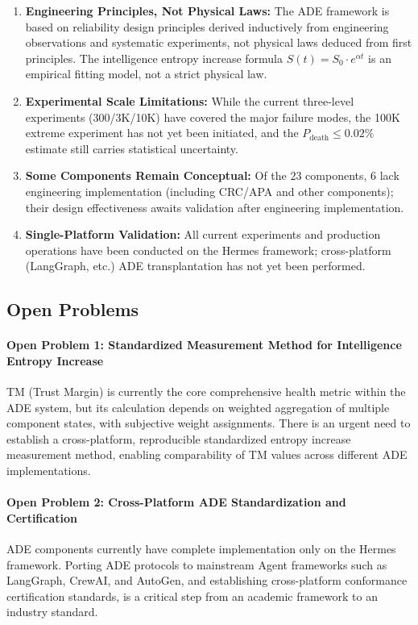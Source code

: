 \documentclass[11pt,a4paper]{article}
\begin{document}
\begin{enumerate}
\item \textbf{Engineering Principles, Not Physical Laws:} The ADE framework is based on reliability design principles derived inductively from engineering observations and systematic experiments, not physical laws deduced from first principles. The intelligence entropy increase formula $S(t) = S_0 \cdot e^{\alpha t}$ is an empirical fitting model, not a strict physical law.

\item \textbf{Experimental Scale Limitations:} While the current three-level experiments (300/3K/10K) have covered the major failure modes, the 100K extreme experiment has not yet been initiated, and the $P_{\text{death}} \leq 0.02\%$ estimate still carries statistical uncertainty.

\item \textbf{Some Components Remain Conceptual:} Of the 23 components, 6 lack engineering implementation (including CRC/APA and other components); their design effectiveness awaits validation after engineering implementation.

\item \textbf{Single-Platform Validation:} All current experiments and production operations have been conducted on the Hermes framework; cross-platform (LangGraph, etc.) ADE transplantation has not yet been performed.
\end{enumerate}

\subsection{Open Problems}
\label{sec:12.3}

\paragraph{Open Problem 1: Standardized Measurement Method for Intelligence Entropy Increase}
TM (Trust Margin) is currently the core comprehensive health metric within the ADE system, but its calculation depends on weighted aggregation of multiple component states, with subjective weight assignments. There is an urgent need to establish a cross-platform, reproducible standardized entropy increase measurement method, enabling comparability of TM values across different ADE implementations.

\paragraph{Open Problem 2: Cross-Platform ADE Standardization and Certification}
ADE components currently have complete implementation only on the Hermes framework. Porting ADE protocols to mainstream Agent frameworks such as LangGraph, CrewAI, and AutoGen, and establishing cross-platform conformance certification standards, is a critical step from an academic framework to an industry standard.
\end{document}
